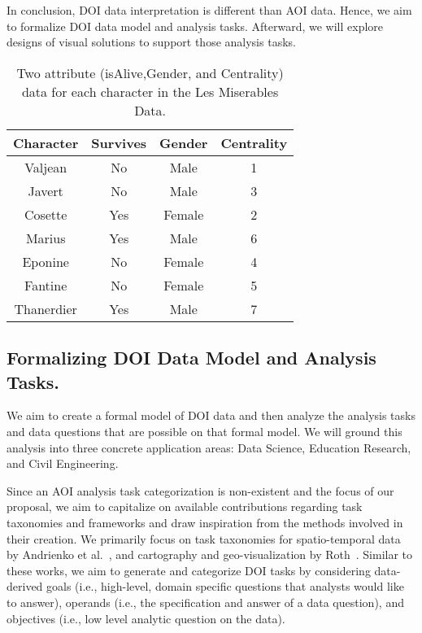 In conclusion, DOI data interpretation is different than AOI data. Hence, we aim to formalize DOI data model and analysis tasks. Afterward, we will explore designs of visual solutions to support those analysis tasks. 

\begin{table*}
	\centering
		\begin{tabular}{|c|c|c|c|}
				\hline
				\textbf{Character}	& \textbf{Survives} &	\textbf{Gender}	& \textbf{Centrality}\\\hline
			
				Valjean	& No	&Male	&1\\\hline
Javert	&No&	Male&	3\\\hline
Cosette 	&Yes	&Female&	2\\\hline
Marius	&Yes	&Male&	6\\\hline
Eponine	&No	&Female&	4\\\hline
Fantine	&No	&Female	&5\\\hline
Thanerdier	&Yes	&Male	&7\\\hline

		\end{tabular}
		\caption{Two attribute (isAlive,Gender, and Centrality) data for each character in the Les Miserables Data. }
		\label{tab:LesMiserablesAttribute}
\end{table*}

\subsection{Formalizing DOI Data Model and Analysis Tasks.}

We aim to create a formal model of DOI data and then analyze the analysis tasks and data questions that are possible on that formal model. We will ground this analysis into three concrete application areas: Data Science, Education Research, and Civil Engineering. 

Since an AOI analysis task categorization is non-existent and the focus of our proposal, we aim to capitalize on available contributions regarding task taxonomies and frameworks and draw inspiration from the methods involved in their creation. We primarily focus on task taxonomies for spatio-temporal data by Andrienko et al.~\cite{And03}, and cartography and geo-visualization by Roth~\cite{Roth13}. Similar to these works, we aim to generate and categorize DOI tasks by considering data-derived goals (i.e., high-level, domain specific questions that analysts would like to answer), operands (i.e., the specification and answer of a data question), and objectives (i.e., low level analytic question on the data). 

